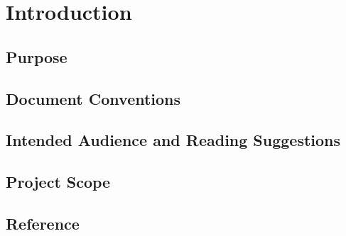 \section{Introduction}

\subsection{Purpose}


\subsection{Document Conventions}


\subsection{Intended Audience and Reading Suggestions}


\subsection{Project Scope}
 

\subsection{Reference}


\begin{enumerate}


\end{enumerate}
